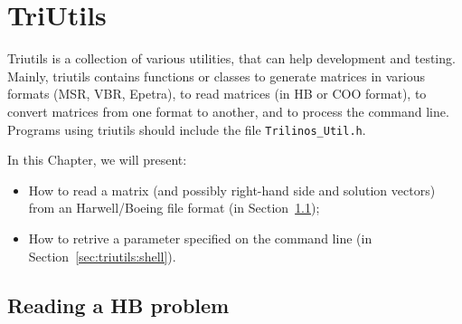 % 
% 
% 
%   
%   
% 
% 

\section{TriUtils}
\label{chap:triutils}

Triutils is a collection of various utilities, that can help development
and testing. Mainly, triutils contains functions or classes to generate
matrices in various formats (MSR, VBR, Epetra), to read matrices (in HB
or COO format), to convert matrices from one format to another, and to
process the command line. Programs using triutils should include the
file \verb!Trilinos_Util.h!.

\medskip

In this Chapter, we will present:
\begin{itemize}
\item How to read a matrix (and possibly right-hand side and solution
  vectors) from an Harwell/Boeing file format (in
  Section~\ref{sec:triutils:reading});
\item How to retrive a parameter specified on the command line (in
  Section~\ref{sec:triutils:shell}). 
\end{itemize}


\subsection{Reading a HB problem}
\label{sec:triutils:reading}

